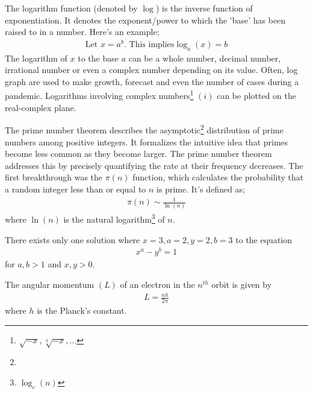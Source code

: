\documentclass{article}
\begin{document}
\begin{mathbox}
The {logarithm} function (denoted by $\log$) is the {inverse} function of {exponentiation}. It denotes the {exponent/power} to which the {'base'} has been raised to in a number. Here's an example;
\begin{align*}
    \text{Let } x = a^b. \text{ This implies} \log_a (x) = b
\end{align*}
The logarithm of $x$ to the base $a$ can be a {whole number, decimal number, irrational number} or even a {complex number} depending on its value. Often, log graph are used to make growth, forecast and even the number of cases during a pandemic. Logarithms involving complex numbers\footnote{\sffamily${\sqrt{-x}, \sqrt[3]{-x}, \dots}$} $(i)$ can be plotted on the real-complex plane.
\end{mathbox}
\begin{mathbox}
The prime number theorem describes the asymptotic\footnote[1]{} distribution of prime numbers among positive integers. It formalizes the intuitive idea that primes become less common as they become larger. The prime number theorem addresses this by precisely quantifying the rate at their frequency decreases. The first breakthrough was the $\pi(n)$ function, which calculates the probability that a random integer less than or equal to $n$ is prime. It's defined as;
\begin{align*}
    \pi(n) \sim \frac{1}{\ln(n)}
\end{align*}
where $\ln (n)$ is the natural logarithm\footnote{$\log_e(n)$} of $n$.
\end{mathbox}
\begin{mathbox}
There exists only {one solution} where $x=3, a=2, y=2, b=3$ to the equation
\begin{align*} 
    x^a - y^b = 1
\end{align*} 
for {$a,b > 1$} and {$x,y > 0$}.
\end{mathbox}
\begin{phybox}
The {angular momentum} $(L)$ of an {electron} in the $n^{th}$ orbit is given by 
\begin{align*} 
    L = \frac{nh}{2\pi} 
\end{align*} where $h$ is the {Planck's constant}. 
\end{phybox}
\end{document}
